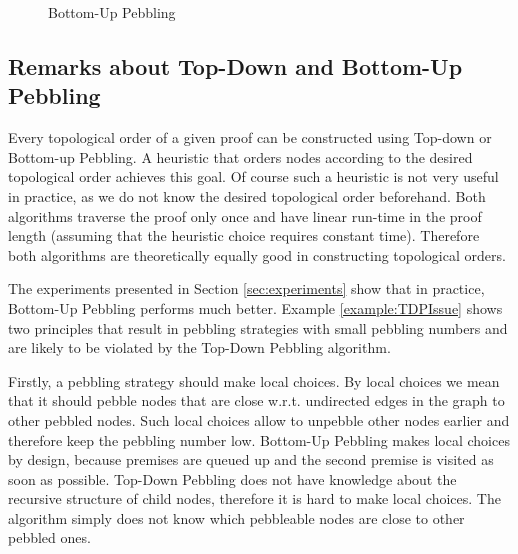 \begin{example}
\begin{figure}[tb]
{\begin{minipage}{0.4\textwidth}
		\end{minipage}%
			}
		\caption{Bottom-Up Pebbling}
		\label{fig:BUP}
\end{figure}
\label{example:BUP}
\end{example}



\subsection{Remarks about Top-Down and Bottom-Up Pebbling} %
\label{sec:TDvsBU}

Every topological order of a given proof can be constructed using Top-down or Bottom-up Pebbling.
A heuristic that orders nodes according to the desired topological order achieves this goal.
Of course such a heuristic is not very useful in practice, as we do not know the desired topological order beforehand.
Both algorithms traverse the proof only once and have linear run-time in the proof length (assuming that the heuristic choice requires constant time).
Therefore both algorithms are theoretically equally good in constructing topological orders.

The experiments presented in Section \ref{sec:experiments} show that in practice, Bottom-Up Pebbling performs much better.
Example \ref{example:TDPIssue} shows two principles that result in pebbling strategies with small pebbling numbers and are likely to be violated by the Top-Down Pebbling algorithm.

Firstly, a pebbling strategy should make local choices.
By local choices we mean that it should pebble nodes that are close w.r.t. undirected edges in the graph to other pebbled nodes.
Such local choices allow to unpebble other nodes earlier and therefore keep the pebbling number low.
Bottom-Up Pebbling makes local choices by design, because premises are queued up and the second premise is visited as soon as possible.
Top-Down Pebbling does not have knowledge about the recursive structure of child nodes, therefore it is hard to make local choices.
The algorithm simply does not know which pebbleable nodes are close to other pebbled ones.


